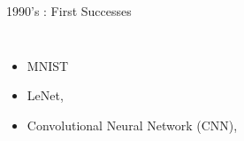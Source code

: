 \documentclass{irdbeamer}
\begin{document}
\begin{frame}[t]{1990's : First Successes}
\begin{columns}[t]
    \vspace{1cm}
    \begin{itemize}
        \item<1-> MNIST\citep{lecun1998mnist}
        \item<2-> LeNet, \citep{lecun1989backpropagation}
        \item<3-> Convolutional Neural Network (CNN), \citep{lecun1989generalization}
    \end{itemize}
\end{columns}
\end{frame}
\end{document}
